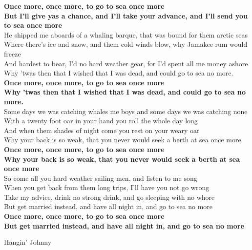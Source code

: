 \documentclass[letterpaper,9pt]{article}
\begin{document}
\textbf{Once more, once more, to go to sea once more \\
But I'll give yas a chance, and I'll take your advance, and I'll send you to sea once more} \\

He shipped me aboards of a whaling barque, that was bound for them arctic seas \\
Where there's ice and snow, and them cold winds blow, why Jamakee rum would freeze \\
And hardest to bear, I'd no hard weather gear, for I'd spent all me money ashore \\
Why 'twas then that I wished that I was dead, and could go to sea no more. \\

\textbf{Once more, once more, to go to sea once more \\
Why 'twas then that I wished that I was dead, and could go to sea no more.} \\

Some days we was catching whales me boys and some days we was catching none \\
With a twenty foot oar in your hand you roll the whole day long \\
And when them shades of night come you rest on your weary oar \\
Why your back is so weak, that you never would seek a berth at sea once more \\

\textbf{Once more, once more, to go to sea once more \\
Why your back is so weak, that you never would seek a berth at sea once more} \\

So come all you hard weather sailing men, and listen to me song \\
When you get back from them long trips, I'll have you not go wrong \\
Take my advice, drink no strong drink, and go sleeping with no whore \\
But get married instead, and have all night in, and go to sea no more \\

\textbf{Once more, once more, to go to sea once more \\
But get married instead, and have all night in, and go to sea no more} \\


\newpage
{}
\Huge
Hangin' Johnny\\
\end{document}
